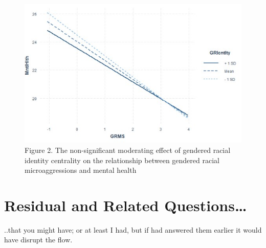 \documentclass[
  11pt,
]{book}
\begin{document}
\begin{figure}
\centering
\includegraphics{images/Modmed/GRMS_MH_GRIC.jpg}
\caption{Figure 2. The non-significant moderating effect of gendered racial identity centrality on the relationship between gendered racial microaggressions and mental health}
\end{figure}

\hypertarget{residual-and-related-questions-2}{%
\section{Residual and Related Questions\ldots{}}\label{residual-and-related-questions-2}}

..that you might have; or at least I had, but if had answered them earlier it would have disrupt the flow.
\end{document}
